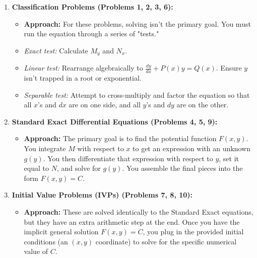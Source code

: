 \documentclass[11pt]{article}
\begin{document}
\begin{enumerate}
    \item \textbf{Classification Problems (Problems 1, 2, 3, 6):}
    \begin{itemize}
        \item \textbf{Approach:} For these problems, solving isn't the primary goal. You must run the equation through a series of "tests." 
        \item \textit{Exact test:} Calculate $M_y$ and $N_x$.
        \item \textit{Linear test:} Rearrange algebraically to $\frac{dy}{dx} + P(x)y = Q(x)$. Ensure $y$ isn't trapped in a root or exponential.
        \item \textit{Separable test:} Attempt to cross-multiply and factor the equation so that all $x$'s and $dx$ are on one side, and all $y$'s and $dy$ are on the other.
    \end{itemize}
    
    \item \textbf{Standard Exact Differential Equations (Problems 4, 5, 9):}
    \begin{itemize}
        \item \textbf{Approach:} The primary goal is to find the potential function $F(x,y)$. You integrate $M$ with respect to $x$ to get an expression with an unknown $g(y)$. You then differentiate that expression with respect to $y$, set it equal to $N$, and solve for $g(y)$. You assemble the final pieces into the form $F(x,y) = C$.
    \end{itemize}

    \item \textbf{Initial Value Problems (IVPs) (Problems 7, 8, 10):}
    \begin{itemize}
        \item \textbf{Approach:} These are solved identically to the Standard Exact equations, but they have an extra arithmetic step at the end. Once you have the implicit general solution $F(x,y) = C$, you plug in the provided initial conditions (an $(x,y)$ coordinate) to solve for the specific numerical value of $C$.
    \end{itemize}
\end{enumerate}
\end{document}

